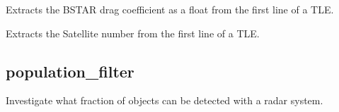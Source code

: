 \documentclass[letterpaper,10pt,english]{sphinxmanual}
\begin{document}

\begin{fulllineitems}
\label{\detokenize{modules/TLE_tools:TLE_tools.tle_bstar}}
Extracts the BSTAR drag coefficient as a float from the first line of a TLE.

\end{fulllineitems}


\begin{fulllineitems}
\label{\detokenize{modules/TLE_tools:TLE_tools.tle_date}}
\end{fulllineitems}


\begin{fulllineitems}
\label{\detokenize{modules/TLE_tools:TLE_tools.tle_id}}
Extracts the Satellite number from the first line of a TLE.

\end{fulllineitems}


\begin{fulllineitems}
\label{\detokenize{modules/TLE_tools:TLE_tools.tle_jd}}
\end{fulllineitems}


\begin{fulllineitems}
\label{\detokenize{modules/TLE_tools:TLE_tools.tle_npdt}}
\end{fulllineitems}



\subsection{population\_filter}
\label{\detokenize{modules/population_filter:module-population_filter}}\label{\detokenize{modules/population_filter:population-filter}}\label{\detokenize{modules/population_filter::doc}}
Investigate what fraction of objects can be detected with a radar system.
\end{document}
